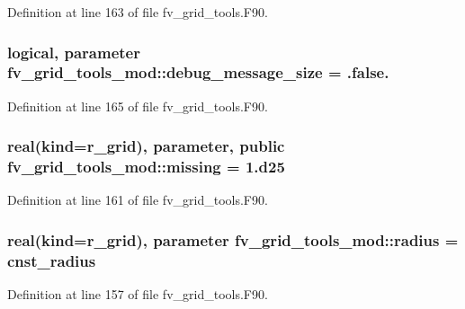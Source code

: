 Definition at line 163 of file fv\-\_\-grid\-\_\-tools.\-F90.

\subsubsection[{debug\-\_\-message\-\_\-size}]{\setlength{\rightskip}{0pt plus 5cm}logical, parameter fv\-\_\-grid\-\_\-tools\-\_\-mod\-::debug\-\_\-message\-\_\-size = .false.\hspace{0.3cm}{\ttfamily [private]}}\label{classfv__grid__tools__mod_a05413bb63130f63c7356403130c339bd}


Definition at line 165 of file fv\-\_\-grid\-\_\-tools.\-F90.

\subsubsection[{missing}]{\setlength{\rightskip}{0pt plus 5cm}real(kind=r\-\_\-grid), parameter, public fv\-\_\-grid\-\_\-tools\-\_\-mod\-::missing = 1.d25}\label{classfv__grid__tools__mod_acb906ec796b589b9fb688bbbe1bee3c8}


Definition at line 161 of file fv\-\_\-grid\-\_\-tools.\-F90.

\subsubsection[{radius}]{\setlength{\rightskip}{0pt plus 5cm}real(kind=r\-\_\-grid), parameter fv\-\_\-grid\-\_\-tools\-\_\-mod\-::radius = cnst\-\_\-radius\hspace{0.3cm}{\ttfamily [private]}}\label{classfv__grid__tools__mod_a832e50f3831e3af6951de1a9ed21fe33}


Definition at line 157 of file fv\-\_\-grid\-\_\-tools.\-F90.

